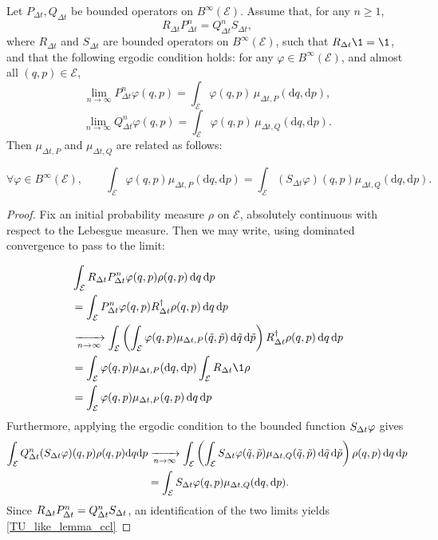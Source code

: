\begin{lemma}
  \label{TU_like_lemma}
  Let $P_{\Delta t}, Q_{\Delta t}$ be bounded operators on $B^\infty(\mathcal E)$.
    Assume that, for any $n\geq 1$,
    $$ R_{\Delta t} P_{\Delta t}^n = Q_{\Delta t}^n S_{\Delta t},$$
    where $R_{\Delta t}$ and $S_{\Delta t}$ are bounded operators on $B^\infty (\mathcal E)$, such that $R_{\Delta t}\1=\1$, and that the following ergodic condition holds: for any $\varphi \in B^\infty(\mathcal E)$, and almost all $(q,p) \in \mathcal E$,
    $$ \underset{n\to\infty}\lim P_{\Delta t}^n\varphi (q,p) = \int_{\mathcal E} \varphi(q,p)\,\mu_{\Delta t,P}(\mathrm{d} q,\mathrm{d} p), $$
    $$ \underset{n\to\infty}\lim Q_{\Delta t}^n\varphi (q,p) = \int_{\mathcal E} \varphi(q,p)\,\mu_{\Delta t,Q}(\mathrm{d} q,\mathrm{d} p).$$
    Then $\mu_{\Delta t,P}$ and $\mu_{\Delta t,Q}$ are related as follows:

    \begin{equation}
      \label{TU_like_lemma_ccl}
    \forall \varphi \in B^\infty(\mathcal E),\qquad\int_{\mathcal E} \varphi(q,p) \mu_{\Delta t,P}(\mathrm{d} q,\mathrm{d} p)=\int_{\mathcal E} \left(S_{\Delta t}\varphi\right)(q,p) \mu_{\Delta t,Q}(\mathrm{d} q,\mathrm{d} p).
    \end{equation}
\end{lemma}
\begin{proof}
  Fix an initial probability measure $\rho$ on $\mathcal E$, absolutely continuous with respect to the Lebesgue measure. Then we may write, using dominated convergence to pass to the limit:

  \begin{align*}
      &\int_{\mathcal E}R_{\Dt}P_{\Delta t}^n \varphi(q,p)\rho(q,p)\,\dif q\,\dif p\\
      &=\int_{\mathcal E}P_{\Delta t}^n \varphi(q,p)R_{\Dt}^{\dagger}\rho(q,p)\,\dif q\,\dif p\\
      &\xrightarrow[n\to\infty]{}\int_{\mathcal E} \left(\int_{\mathcal E}\varphi(q,p)\mu_{\Delta t,P}(\tilde q,\tilde p)\,\dif\tilde q\,\dif \tilde p\right) R_{\Dt}^\dagger \rho(q,p)\,\dif q\,\dif p\\
      &=\int_{\mathcal E}\varphi(q,p)\mu_{\Delta t,P}(\text d q,\text d p)\int_{\mathcal E}R_{\Dt}\1\rho\\
      &=\int_{\mathcal E}\varphi(q,p)\mu_{\Delta t,P}(q,p)\,\dif q\,\dif p
  \end{align*}
  Furthermore, applying the ergodic condition to the bounded function $S_{{\Delta t}}\varphi$ gives
  \begin{align*}
  \int_{\mathcal E} Q_{\Delta t}^n (S_{{\Delta t}}\varphi)(q,p) \rho(q, p) \text d q \text d p &\xrightarrow[n\to\infty]{}\int_{\mathcal E} \left(\int_{\mathcal E}S_{{\Delta t}}\varphi(\tilde q,\tilde p)\mu_{\Delta t,Q}(\tilde q,\tilde p)\,\mathrm{d} \tilde q\, \mathrm{d} \tilde p\right)\rho(q,p)\,\mathrm{d} q\,\mathrm{d} p\\
  &=\int_{\mathcal E}S_{{\Delta t}}\varphi(q,p)\mu_{\Delta t,Q}(\text d q,\text d p).
  \end{align*}
  Since $R_{{\Delta t}}P_{\Delta t}^n=Q_{\Delta t}^n S_{{\Delta t}}$, an identification of the two limits yields \eqref{TU_like_lemma_ccl}
\end{proof}

